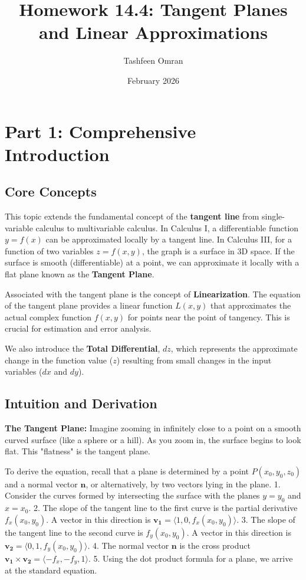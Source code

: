 \documentclass{article}
\title{\textbf{Homework 14.4: Tangent Planes and Linear Approximations}}
\author{Tashfeen Omran}
\date{February 2026}
\begin{document}
\maketitle
\tableofcontents
\newpage

\section{Part 1: Comprehensive Introduction}

\subsection{Core Concepts}
This topic extends the fundamental concept of the \textbf{tangent line} from single-variable calculus to multivariable calculus. In Calculus I, a differentiable function $y = f(x)$ can be approximated locally by a tangent line. In Calculus III, for a function of two variables $z = f(x, y)$, the graph is a surface in 3D space. If the surface is smooth (differentiable) at a point, we can approximate it locally with a flat plane known as the \textbf{Tangent Plane}.

Associated with the tangent plane is the concept of \textbf{Linearization}. The equation of the tangent plane provides a linear function $L(x, y)$ that approximates the actual complex function $f(x, y)$ for points near the point of tangency. This is crucial for estimation and error analysis.

We also introduce the \textbf{Total Differential}, $dz$, which represents the approximate change in the function value ($z$) resulting from small changes in the input variables ($dx$ and $dy$).

\subsection{Intuition and Derivation}
\textbf{The Tangent Plane:}
Imagine zooming in infinitely close to a point on a smooth curved surface (like a sphere or a hill). As you zoom in, the surface begins to look flat. This "flatness" is the tangent plane.

To derive the equation, recall that a plane is determined by a point $P(x_0, y_0, z_0)$ and a normal vector $\mathbf{n}$, or alternatively, by two vectors lying in the plane.
1. Consider the curves formed by intersecting the surface with the planes $y = y_0$ and $x = x_0$.
2. The slope of the tangent line to the first curve is the partial derivative $f_x(x_0, y_0)$. A vector in this direction is $\mathbf{v_1} = \langle 1, 0, f_x(x_0, y_0) \rangle$.
3. The slope of the tangent line to the second curve is $f_y(x_0, y_0)$. A vector in this direction is $\mathbf{v_2} = \langle 0, 1, f_y(x_0, y_0) \rangle$.
4. The normal vector $\mathbf{n}$ is the cross product $\mathbf{v_1} \times \mathbf{v_2} = \langle -f_x, -f_y, 1 \rangle$.
5. Using the dot product formula for a plane, we arrive at the standard equation.
\end{document}
